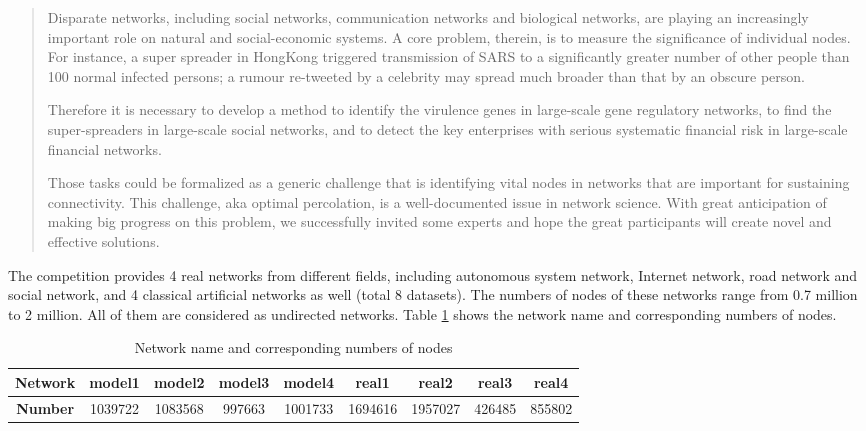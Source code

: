 \documentclass{article}
\newenvironment{itquote}
{\begin{quote}\itshape}
	{\end{quote}\ignorespacesafterend}
\begin{document}
	\begin{itquote}
		
		Disparate networks, including social networks, communication networks and biological networks, are playing an increasingly important role on natural and social-economic systems. A core problem, therein, is to measure the significance of individual nodes. For instance, a super spreader in HongKong triggered transmission of SARS to a significantly greater number of other people than 100 normal infected persons; a rumour re-tweeted by a celebrity may spread much broader than that by an obscure person.
		
		Therefore it is necessary to develop a method to identify the virulence genes in large-scale gene regulatory networks, to find the super-spreaders in large-scale social networks, and to detect the key enterprises with serious systematic financial risk in large-scale financial networks.
		
		Those tasks could be formalized as a generic challenge that is identifying vital nodes in networks that are important for sustaining connectivity. This challenge, aka optimal percolation, is a well-documented issue in network science. With great anticipation of making big progress on this problem, we successfully invited some experts and hope the great participants will create novel and effective solutions.  		
	\end{itquote}

	
	The competition provides 4 real networks from different fields, including autonomous system network, Internet network, road network and social network, and 4 classical artificial networks as well (total 8 datasets). The numbers of nodes of these networks range from 0.7 million to 2 million. All of them are considered as undirected networks. Table \ref{tab:table1} shows the network name and corresponding numbers of nodes.
	

\begin{table}[]
	
	\centering
	\caption{ Network name and corresponding numbers of nodes}
	\label{tab:table1}
		\begin{tabular}{|c|c|c|c|c|c|c|c|c|}
			\hline
			\textbf{Network} & \textbf{model1} & \textbf{model2} & \textbf{model3} & \textbf{model4} & \textbf{real1} & \textbf{real2} & \textbf{real3} & \textbf{real4} \\ \hline
			\textbf{Number} & 1039722         & 1083568         & 997663          & 1001733         & 1694616        & 1957027        & 426485         & 855802         \\ \hline
		\end{tabular}
	\end{table}
\end{document}
